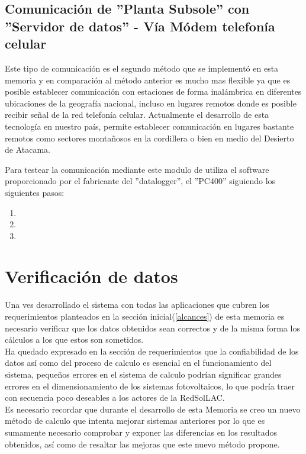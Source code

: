 \subsection{Comunicación de ''Planta Subsole'' con ''Servidor de datos'' - Vía Módem telefonía celular}
Este tipo de comunicación es el segundo método que se implementó en esta memoria y en comparación al método anterior es mucho mas flexible ya que es posible establecer comunicación con estaciones de forma inalámbrica en diferentes ubicaciones de la geografía nacional, incluso en lugares remotos donde es posible recibir señal de la red telefonía celular. Actualmente el desarrollo de esta tecnología en nuestro país, permite establecer comunicación en lugares bastante remotos como sectores montañosos en la cordillera o bien en medio del Desierto de Atacama.

Para testear la comunicación mediante este modulo de utiliza el software proporcionado por el fabricante del ''datalogger'', el ''PC400'' siguiendo los siguientes pasos:

\begin{enumerate}
\item
\item
\item
\end{enumerate}

\section{Verificación de datos}
Una ves desarrollado el sistema con todas las aplicaciones que cubren los requerimientos planteados en la sección inicial(\ref{alcances}) de esta memoria es necesario verificar que los datos obtenidos sean correctos y de la misma forma los cálculos a los que estos son sometidos.\\
Ha quedado expresado en la sección de requerimientos que la confiabilidad de los datos así como del proceso de calculo es esencial en el funcionamiento del sistema, pequeños errores en el sistema de calculo podrían significar grandes errores en el dimensionamiento de los sistemas fotovoltaicos, lo que podría traer con secuencia poco deseables a los actores de la RedSolLAC.\\
Es necesario recordar que durante el desarrollo de esta Memoria se creo un nuevo método de calculo que intenta mejorar sistemas anteriores por lo que es sumamente necesario comprobar y exponer las diferencias en los resultados obtenidos, así como de resaltar las mejoras que este nuevo método propone.\\

